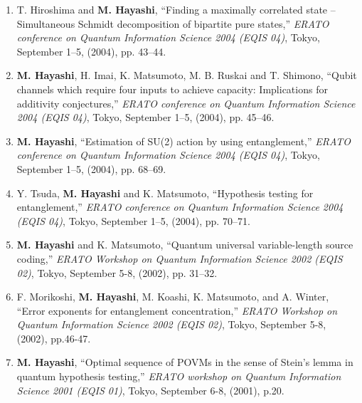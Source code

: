 \documentclass[a4paper,12pt,oneside]{article}
\begin{document}
\begin{enumerate}
\item
T. Hiroshima and \textbf{M. Hayashi}, ``Finding a maximally correlated state -- Simultaneous Schmidt decomposition of bipartite pure states,'' 
{\em ERATO conference on Quantum Information Science 2004 (EQIS 04)}, 
Tokyo, September 1--5, (2004), pp. 43--44.

\item
\textbf{M. Hayashi}, H. Imai, K. Matsumoto, M. B. Ruskai and T. Shimono, ``Qubit channels which require four inputs to achieve capacity: Implications for additivity conjectures,'' 
{\em ERATO conference on Quantum Information Science 2004 (EQIS 04)}, 
Tokyo, September 1--5, (2004), 
pp. 45--46.

\item
\textbf{M. Hayashi}, ``Estimation of SU(2) action by using entanglement,'' 
{\em ERATO conference on Quantum Information Science 2004 (EQIS 04)}, 
Tokyo, September 1--5, (2004), 
pp. 68--69.

\item
Y. Tsuda, \textbf{M. Hayashi} and K. Matsumoto, ``Hypothesis testing for entanglement,'' 
{\em ERATO conference on Quantum Information Science 2004 (EQIS 04)}, 
Tokyo, September 1--5, (2004), 
pp. 70--71.

\item
\textbf{M. Hayashi} and K. Matsumoto, ``Quantum universal variable-length source coding,'' 
{\em ERATO Workshop on Quantum Information Science 2002 (EQIS 02)}, 
Tokyo, September 5-8, (2002), 
pp. 31--32.

\item
F. Morikoshi, \textbf{M. Hayashi}, M. Koashi, K. Matsumoto, and A. Winter, ``Error exponents for entanglement concentration,'' 
{\em ERATO Workshop on Quantum Information Science 2002 (EQIS 02)}, 
Tokyo, September 5-8, (2002), 
pp.46-47.

\item
\textbf{M. Hayashi}, ``Optimal sequence of POVMs in the sense of Stein's lemma in quantum hypothesis testing,'' 
{\em ERATO workshop on Quantum Information Science 2001 (EQIS 01)}, 
Tokyo, September 6-8, (2001), p.20.

\end{enumerate}
\end{document}
